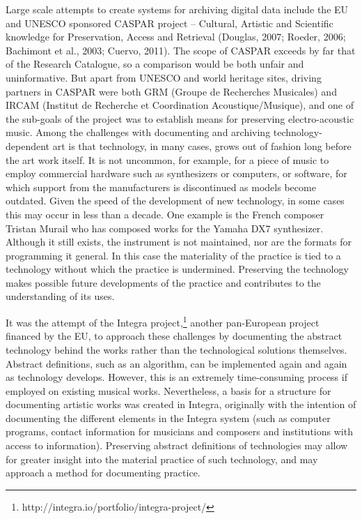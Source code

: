 Large scale attempts to create systems for archiving digital data
include the EU and UNESCO sponsored CASPAR project -- Cultural, Artistic
and Scientific knowledge for Preservation, Access and Retrieval
(Douglas, 2007; Roeder, 2006; Bachimont et al., 2003; Cuervo, 2011). The
scope of CASPAR exceeds by far that of the Research Catalogue, so a
comparison would be both unfair and uninformative. But apart from UNESCO
and world heritage sites, driving partners in CASPAR were both GRM
(Groupe de Recherches Musicales) and IRCAM (Institut de Recherche et
Coordination Acoustique/Musique), and one of the sub-goals of the
project was to establish means for preserving electro-acoustic music.
Among the challenges with documenting and archiving technology-dependent
art is that technology, in many cases, grows out of fashion long before
the art work itself. It is not uncommon, for example, for a piece of
music to employ commercial hardware such as synthesizers or computers,
or software, for which support from the manufacturers is discontinued as
models become outdated. Given the speed of the development of new
technology, in some cases this may occur in less than a decade. One
example is the French composer Tristan Murail who has composed works for
the Yamaha DX7 synthesizer. Although it still exists, the instrument is
not maintained, nor are the formats for programming it general. In this
case the materiality of the practice is tied to a technology without
which the practice is undermined. Preserving the technology makes
possible future developments of the practice and contributes to the
understanding of its uses.

It was the attempt of the Integra project,\footnote{http://integra.io/portfolio/integra-project/}
another pan-European project financed by the EU, to approach these
challenges by documenting the abstract technology behind the works
rather than the technological solutions themselves. Abstract
definitions, such as an algorithm, can be implemented again and again as
technology develops. However, this is an extremely time-consuming
process if employed on existing musical works. Nevertheless, a basis for
a structure for documenting artistic works was created in Integra,
originally with the intention of documenting the different elements in
the Integra system (such as computer programs, contact information for
musicians and composers and institutions with access to information).
Preserving abstract definitions of technologies may allow for greater
insight into the material practice of such technology, and may approach
a method for documenting practice.

